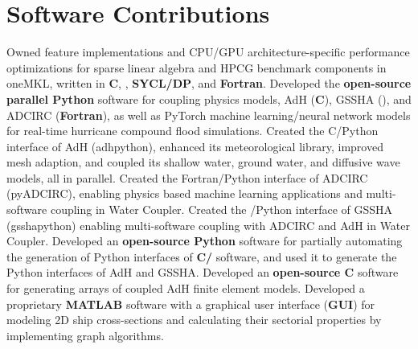 \documentclass[letterpaper,10pt]{article}
\begin{document}
\section{Software Contributions}
  \resumeSubItemListStart
      {Owned feature implementations and CPU/GPU architecture-specific
       performance optimizations for sparse linear algebra and HPCG benchmark
       components in oneMKL, written in \textbf{C}, \textbf{\CC{}},
       \textbf{SYCL/DP\CC{}}, and \textbf{Fortran}.}
      {Developed the \textbf{open-source parallel Python} software for coupling
      physics models, AdH (\textbf{C}), GSSHA (\textbf{\CC{}}), and ADCIRC
      (\textbf{Fortran}), as well as PyTorch machine learning/neural network
      models for real-time hurricane compound flood simulations.}
      {Created the C/Python interface of AdH (adhpython), enhanced its meteorological library,
      improved mesh adaption, and coupled its shallow water, ground
      water, and diffusive wave models, all in parallel.}
      {Created the Fortran/Python interface of ADCIRC (pyADCIRC), enabling physics
      based machine learning applications and multi-software coupling in Water
      Coupler.}
      {Created the \CC{}/Python interface of GSSHA (gsshapython) enabling
      multi-software coupling with ADCIRC and AdH in Water Coupler.}
      {Developed an \textbf{open-source Python} software for partially
      automating the generation of Python interfaces of \textbf{C/\CC{}}
      software, and used it to generate the Python interfaces of AdH and GSSHA.}
      {Developed an \textbf{open-source C} software for generating arrays of
      coupled AdH finite element models.}
      {Developed a proprietary \textbf{MATLAB} software with a graphical user
      interface (\textbf{GUI}) for modeling 2D ship cross-sections and
      calculating their sectorial properties by implementing graph algorithms.}
  \resumeSubItemListEnd
\vspace{-5pt}
\end{document}
